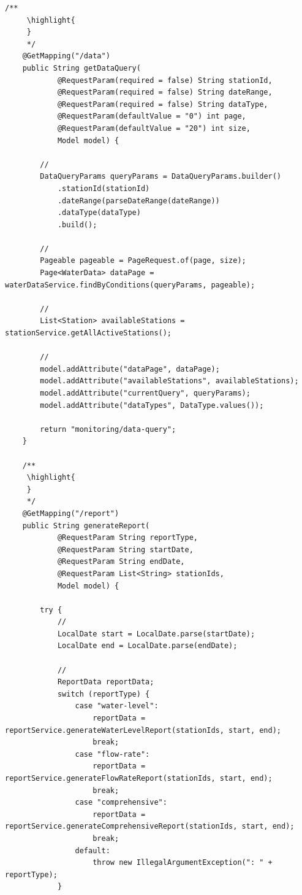\begin{lstlisting}[style=java]
    /**
     \highlight{ 
     } 
     */
    @GetMapping("/data")
    public String getDataQuery(
            @RequestParam(required = false) String stationId,
            @RequestParam(required = false) String dateRange,
            @RequestParam(required = false) String dataType,
            @RequestParam(defaultValue = "0") int page,
            @RequestParam(defaultValue = "20") int size,
            Model model) {
        
        // 
        DataQueryParams queryParams = DataQueryParams.builder()
            .stationId(stationId)
            .dateRange(parseDateRange(dateRange))
            .dataType(dataType)
            .build();
        
        // 
        Pageable pageable = PageRequest.of(page, size);
        Page<WaterData> dataPage = waterDataService.findByConditions(queryParams, pageable);
        
        // 
        List<Station> availableStations = stationService.getAllActiveStations();
        
        // 
        model.addAttribute("dataPage", dataPage);
        model.addAttribute("availableStations", availableStations);
        model.addAttribute("currentQuery", queryParams);
        model.addAttribute("dataTypes", DataType.values());
        
        return "monitoring/data-query";
    }
    
    /**
     \highlight{ 
     } 
     */
    @GetMapping("/report")
    public String generateReport(
            @RequestParam String reportType,
            @RequestParam String startDate,
            @RequestParam String endDate,
            @RequestParam List<String> stationIds,
            Model model) {
        
        try {
            // 
            LocalDate start = LocalDate.parse(startDate);
            LocalDate end = LocalDate.parse(endDate);
            
            // 
            ReportData reportData;
            switch (reportType) {
                case "water-level":
                    reportData = reportService.generateWaterLevelReport(stationIds, start, end);
                    break;
                case "flow-rate":
                    reportData = reportService.generateFlowRateReport(stationIds, start, end);
                    break;
                case "comprehensive":
                    reportData = reportService.generateComprehensiveReport(stationIds, start, end);
                    break;
                default:
                    throw new IllegalArgumentException(": " + reportType);
            }
            

\end{lstlisting}
